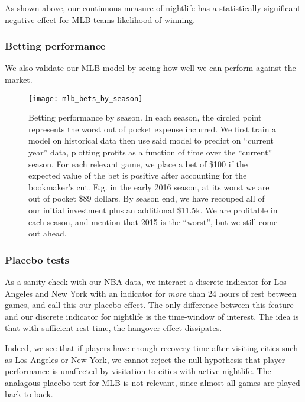 \documentclass[letterpaper,12pt]{article}
\begin{document}
As shown above, our continuous measure of nightlife has a statistically significant negative effect for MLB teams likelihood of winning.

\subsubsection{Betting performance}
We also validate our MLB model by seeing how well we can perform against the
market.
\begin{figure}[!h]
  \centering
  \label{mlb bets by season}
  \texttt{[image: mlb\_bets\_by\_season]}
  \caption{Betting performance by season. In each season, the 
    circled point represents the worst out of pocket expense incurred.
    We first train a model on historical data then use said model to predict on ``current year''
    data, plotting profits as a function of time over the ``current'' season. For each relevant
    game, we place a bet of \$100 if the expected value of the bet is positive after accounting for the bookmaker's cut. E.g. in the early 2016 season,
    at its worst we are out of pocket \$89 dollars. By season end, we have     recouped all of
    our initial investment plus an additional \$11.5k. We are profitable in each season, and mention that 2015 is the ``worst'', but we still come out ahead.}
  \label{bettingperf}
\end{figure}

\subsubsection{Placebo tests} As a sanity check with our NBA data, we interact a
discrete-indicator for Los Angeles and New York with an 
indicator for \emph{more} than 24 hours of rest
between games, and call this our placebo effect. The only difference between this feature
and our discrete indicator for nightlife is the time-window of interest.
The idea is that with sufficient rest time, the hangover effect dissipates.

Indeed, we see that if players have enough recovery time after visiting cities such as Los
Angeles or New York, we cannot reject the null hypothesis that player performance is unaffected
by visitation to cities with active nightlife. The analagous placebo test
for MLB is not relevant, since almost all games are played back to back.
\end{document}
